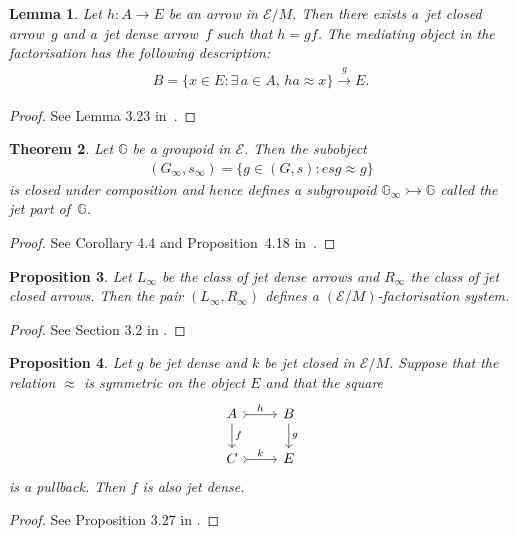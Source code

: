 \documentclass[pdftex]{sigma}
\numberwithin{equation}{section}
\newtheorem{Theorem}{Theorem}[section]
\newtheorem{Lemma}[Theorem]{Lemma}
\newtheorem{Proposition}[Theorem]{Proposition}
{ \theoremstyle{definition}
\newtheorem{Definition}[Theorem]{Definition}
\newtheorem{Notation}[Theorem]{Notation}
\newtheorem{Example}[Theorem]{Example}
\newtheorem{Remark}[Theorem]{Remark} }
\begin{document}
\begin{Lemma}\label{lem:existence-of-w-factorisations}Let $h\colon A\rightarrow E$ be an arrow in $\mathcal{E}/M$. Then there exists a~jet closed arrow~$g$ and a~jet dense arrow~$f$ such that $h=gf$. The mediating object in the factorisation has the following description:
\begin{gather*}B=\{x\in E\colon \exists\, a\in A,\, ha\approx x\}\xrightarrow{g} E.\end{gather*}
\end{Lemma}
\begin{proof}See Lemma 3.23 in~\cite{burke-relative-to-local-models}.
\end{proof}

\begin{Theorem}
Let $\mathbb{G}$ be a groupoid in $\mathcal{E}$. Then the subobject
 \begin{gather*}(G_{\infty},s_{\infty})=\{g\in (G,s)\colon esg\approx g\}\end{gather*}
is closed under composition and hence defines a subgroupoid $\mathbb{G}_{\infty} \rightarrowtail \mathbb{G}$ called the \emph{jet part of~$\mathbb{G}$}.
\end{Theorem}
 \begin{proof}
 See Corollary 4.4 and Proposition~4.18 in~\cite{burke-relative-to-local-models}.
 \end{proof}

\begin{Proposition}Let $L_{\infty}$ be the class of jet dense arrows and $R_{\infty}$ the class of jet closed arrows. Then the pair $(L_{\infty},R_{\infty})$ defines a $(\mathcal{E}/M)$-factorisation system.
\end{Proposition}
 \begin{proof}See Section 3.2 in \cite{burke-relative-to-local-models}.
 \end{proof}

\begin{Proposition}\label{proposition:dense-stable-along-closed-when-symmetric}
Let $g$ be jet dense and $k$ be jet closed in ${\mathcal E}/M$. Suppose that the relation $\approx$ is symmetric on the object $E$ and that the square
\begin{equation*}\begin{tikzcd}
A \dar{f} \rar[rightarrowtail]{h} & B \dar{g} \\
C \rar[rightarrowtail]{k} & E
\end{tikzcd}\end{equation*}
is a pullback. Then $f$ is also jet dense.
\end{Proposition}
\begin{proof}
 See Proposition 3.27 in \cite{burke-relative-to-local-models}.
\end{proof}
\end{document}
